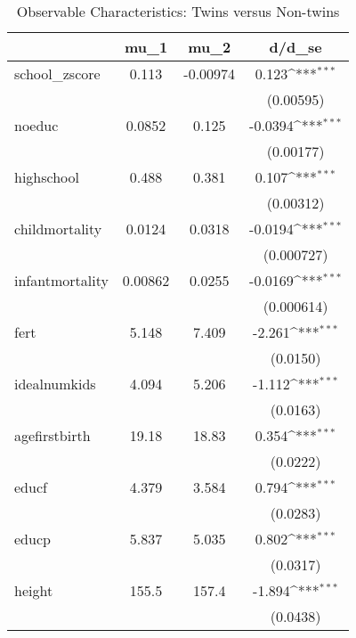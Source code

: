 \begin{table}[htbp]\centering
\def\sym#1{\ifmmode^{#1}\else\(^{#1}\)\fi}
\caption{Observable Characteristics: Twins versus Non-twins\label{tab1}}
\begin{tabular}{l*{1}{ccc}}
\toprule
            &        mu\_1&        mu\_2&      d/d\_se         \\
\midrule
school\_zscore&       0.113&    -0.00974&       0.123\sym{***}\\
            &            &            &   (0.00595)         \\
noeduc      &      0.0852&       0.125&     -0.0394\sym{***}\\
            &            &            &   (0.00177)         \\
highschool  &       0.488&       0.381&       0.107\sym{***}\\
            &            &            &   (0.00312)         \\
childmortality&      0.0124&      0.0318&     -0.0194\sym{***}\\
            &            &            &  (0.000727)         \\
infantmortality&     0.00862&      0.0255&     -0.0169\sym{***}\\
            &            &            &  (0.000614)         \\
fert        &       5.148&       7.409&      -2.261\sym{***}\\
            &            &            &    (0.0150)         \\
idealnumkids&       4.094&       5.206&      -1.112\sym{***}\\
            &            &            &    (0.0163)         \\
agefirstbirth&       19.18&       18.83&       0.354\sym{***}\\
            &            &            &    (0.0222)         \\
educf       &       4.379&       3.584&       0.794\sym{***}\\
            &            &            &    (0.0283)         \\
educp       &       5.837&       5.035&       0.802\sym{***}\\
            &            &            &    (0.0317)         \\
height      &       155.5&       157.4&      -1.894\sym{***}\\
            &            &            &    (0.0438)         \\

\end{tabular}
\end{table}
